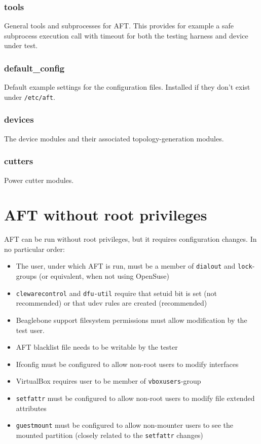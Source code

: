 \documentclass[a4paper,11pt]{article}
\newcommand{\cmd}[1]{\texttt{#1}}
\begin{document}
\subsubsection*{tools}
General tools and subprocesses for AFT. This provides for example a safe subprocess execution call with timeout for both the testing harness and device under test.

\subsubsection*{default\_config}
Default example settings for the configuration files. Installed if they don't exist under \cmd{/etc/aft}.

\subsubsection*{devices}
The device modules and their associated topology-generation modules.

\subsubsection*{cutters}
Power cutter modules.

\section{AFT without root privileges}
\label{app:noroot}

AFT can be run without root privileges, but it requires configuration changes. In no particular order:

\begin{itemize}
\item The user, under which AFT is run, must be a member of \cmd{dialout} and \cmd{lock}-groups (or equivalent, when not using OpenSuse)
\item \cmd{clewarecontrol} and \cmd{dfu-util} require that setuid bit is set (not recommended) or that udev rules are created (recommended)
\item Beaglebone support filesystem permissions must allow modification by the test user.
\item AFT blacklist file needs to be writable by the tester
\item Ifconfig must be configured to allow non-root users to modify interfaces
\item VirtualBox requires user to be member of \cmd{vboxusers}-group
\item \cmd{setfattr} must be configured to allow non-root users to modify file extended attributes
\item \cmd{guestmount} must be configured to allow non-mounter users to see the mounted partition (closely related to the \cmd{setfattr} changes)

\end{itemize}
\end{document}
